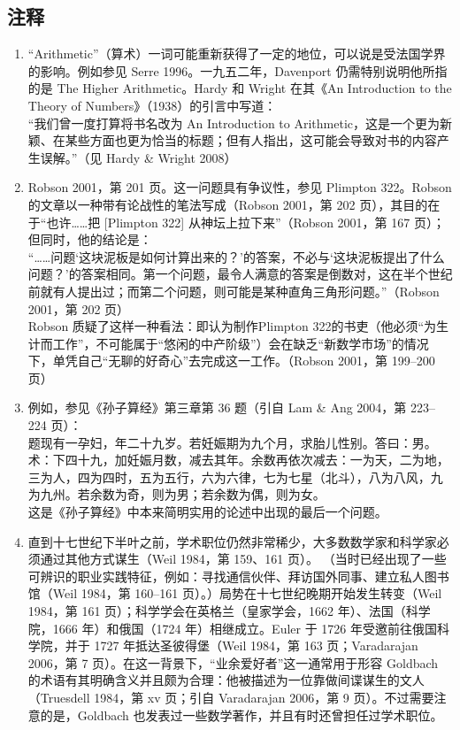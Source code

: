 \subsection{注释}
\begin{enumerate}
\item “Arithmetic”（算术）一词可能重新获得了一定的地位，可以说是受法国学界的影响。例如参见 Serre 1996。一九五二年，Davenport 仍需特别说明他所指的是 The Higher Arithmetic。Hardy 和 Wright 在其《An Introduction to the Theory of Numbers》（1938）的引言中写道：\\
“我们曾一度打算将书名改为 An Introduction to Arithmetic，这是一个更为新颖、在某些方面也更为恰当的标题；但有人指出，这可能会导致对书的内容产生误解。”（见 Hardy & Wright 2008）
\item Robson 2001，第 201 页。这一问题具有争议性，参见 Plimpton 322。Robson 的文章以一种带有论战性的笔法写成（Robson 2001，第 202 页），其目的在于“也许……把 [Plimpton 322] 从神坛上拉下来”（Robson 2001，第 167 页）；但同时，他的结论是：\\
“……问题‘这块泥板是如何计算出来的？’的答案，不必与‘这块泥板提出了什么问题？’的答案相同。第一个问题，最令人满意的答案是倒数对，这在半个世纪前就有人提出过；而第二个问题，则可能是某种直角三角形问题。”（Robson 2001，第 202 页）\\
Robson 质疑了这样一种看法：即认为制作Plimpton 322的书吏（他必须“为生计而工作”，不可能属于“悠闲的中产阶级”）会在缺乏“新数学市场”的情况下，单凭自己“无聊的好奇心”去完成这一工作。（Robson 2001，第 199–200 页）
\item 例如，参见《孙子算经》第三章第 36 题（引自 Lam & Ang 2004，第 223–224 页）：\\
[36] 题现有一孕妇，年二十九岁。若妊娠期为九个月，求胎儿性别。答曰：男。
术：下四十九，加妊娠月数，减去其年。余数再依次减去：一为天，二为地，三为人，四为四时，五为五行，六为六律，七为七星（北斗），八为八风，九为九州。若余数为奇，则为男；若余数为偶，则为女。\\
这是《孙子算经》中本来简明实用的论述中出现的最后一个问题。
\item 直到十七世纪下半叶之前，学术职位仍然非常稀少，大多数数学家和科学家必须通过其他方式谋生（Weil 1984，第 159、161 页）。 （当时已经出现了一些可辨识的职业实践特征，例如：寻找通信伙伴、拜访国外同事、建立私人图书馆（Weil 1984，第 160–161 页）。）局势在十七世纪晚期开始发生转变（Weil 1984，第 161 页）；科学学会在英格兰（皇家学会，1662 年）、法国（科学院，1666 年）和俄国（1724 年）相继成立。Euler 于 1726 年受邀前往俄国科学院，并于 1727 年抵达圣彼得堡（Weil 1984，第 163 页；Varadarajan 2006，第 7 页）。在这一背景下，“业余爱好者”这一通常用于形容 Goldbach 的术语有其明确含义并且颇为合理：他被描述为一位靠做间谍谋生的文人（Truesdell 1984，第 xv 页；引自 Varadarajan 2006，第 9 页）。不过需要注意的是，Goldbach 也发表过一些数学著作，并且有时还曾担任过学术职位。

\end{enumerate}
